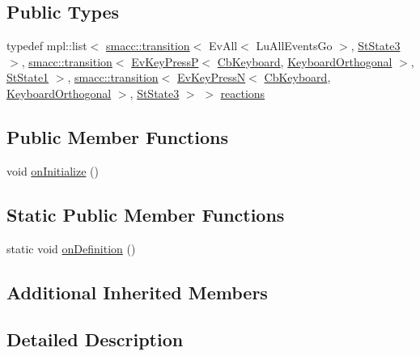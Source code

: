 \subsection*{Public Types}
\begin{DoxyCompactItemize}
\item 
typedef mpl\+::list$<$ \hyperlink{classsmacc_1_1transition}{smacc\+::transition}$<$ Ev\+All$<$ Lu\+All\+Events\+Go $>$, \hyperlink{structsm__three__some_1_1StState3}{St\+State3} $>$, \hyperlink{classsmacc_1_1transition}{smacc\+::transition}$<$ \hyperlink{structsm__three__some_1_1EvKeyPressP}{Ev\+Key\+PressP}$<$ \hyperlink{classsm__three__some_1_1CbKeyboard}{Cb\+Keyboard}, \hyperlink{classsm__three__some_1_1KeyboardOrthogonal}{Keyboard\+Orthogonal} $>$, \hyperlink{structsm__three__some_1_1StState1}{St\+State1} $>$, \hyperlink{classsmacc_1_1transition}{smacc\+::transition}$<$ \hyperlink{structsm__three__some_1_1EvKeyPressN}{Ev\+Key\+PressN}$<$ \hyperlink{classsm__three__some_1_1CbKeyboard}{Cb\+Keyboard}, \hyperlink{classsm__three__some_1_1KeyboardOrthogonal}{Keyboard\+Orthogonal} $>$, \hyperlink{structsm__three__some_1_1StState3}{St\+State3} $>$ $>$ \hyperlink{structsm__three__some_1_1StState2_afd45ee8d9aa8e149a4e7cc199e97807b}{reactions}
\end{DoxyCompactItemize}
\subsection*{Public Member Functions}
\begin{DoxyCompactItemize}
\item 
void \hyperlink{structsm__three__some_1_1StState2_a31e1bc14ec72b4fa9dcc6a11d8e77762}{on\+Initialize} ()
\end{DoxyCompactItemize}
\subsection*{Static Public Member Functions}
\begin{DoxyCompactItemize}
\item 
static void \hyperlink{structsm__three__some_1_1StState2_a6fbadc32e16e7c1defafe35a6e1b08da}{on\+Definition} ()
\end{DoxyCompactItemize}
\subsection*{Additional Inherited Members}


\subsection{Detailed Description}


